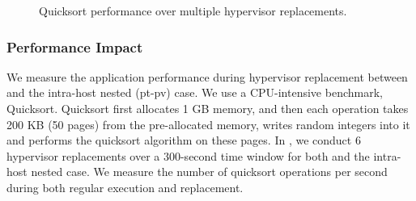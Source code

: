 \begin{figure}
	\centering
	\caption{Quicksort performance over multiple hypervisor replacements.}
	\label{fig:implq}
\end{figure}



\subsubsection{Performance Impact} 
We measure the application performance during hypervisor replacement between \arch and the intra-host nested (pt-pv) case. We use a CPU-intensive benchmark, Quicksort.
Quicksort first allocates 1 GB memory, and then each operation takes 200 KB (50 pages) from the pre-allocated memory, writes random integers into it and performs the quicksort algorithm on these pages. In , we conduct 6 hypervisor replacements over a 300-second time window for both \arch and the intra-host nested case. We measure the number of quicksort operations per second during both regular execution and replacement.

